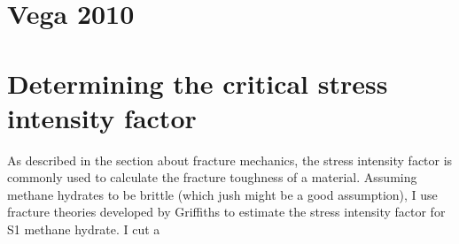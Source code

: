 \section{Vega 2010}
\section{Determining the critical stress intensity factor}
As described in the section about fracture mechanics, the stress intensity factor is commonly used to calculate the fracture toughness of a material. Assuming methane hydrates to be brittle (which jush might be a good assumption), I use fracture theories developed by Griffiths to estimate the stress intensity factor for S1 methane hydrate. I cut a 

